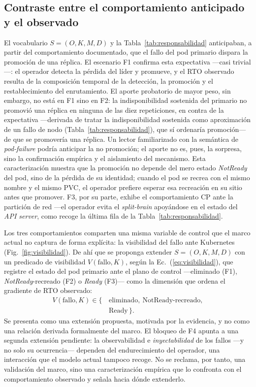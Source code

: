 \documentclass[12pt,twocolumn,letterpaper]{article}
\newcommand{\Ec}[1]{Ec.~(\ref{#1})}
\begin{document}
\subsection{Contraste entre el comportamiento anticipado y el observado}
El vocabulario $S=(O,K,M,D)$ y la Tabla~\ref{tab:responsabilidad} anticipaban, a partir del comportamiento documentado, que el fallo del pod primario dispara la promoción de una réplica. El escenario F1 confirma esta expectativa —casi trivial—: el operador detecta la pérdida del líder y promueve, y el RTO observado resulta de la composición temporal de la detección, la promoción y el restablecimiento del enrutamiento. El aporte probatorio de mayor peso, sin embargo, no está en F1 sino en F2: la indisponibilidad sostenida del primario no promovió una réplica en ninguna de las diez repeticiones, en contra de la expectativa —derivada de tratar la indisponibilidad sostenida como aproximación de un fallo de nodo (Tabla~\ref{tab:responsabilidad}), que sí ordenaría promoción— de que se promovería una réplica. Un lector familiarizado con la semántica de \textit{pod-failure} podría anticipar la no promoción; el aporte no es, pues, la sorpresa, sino la confirmación empírica y el aislamiento del mecanismo. Esta caracterización muestra que la promoción no depende del mero estado \textit{NotReady} del pod, sino de la pérdida de su identidad; cuando el pod se recrea con el mismo nombre y el mismo PVC, el operador prefiere esperar esa recreación en su sitio antes que promover. F3, por su parte, exhibe el comportamiento CP ante la partición de red —el operador evita el \textit{split-brain} apoyándose en el estado del \textit{API server}, como recoge la última fila de la Tabla~\ref{tab:responsabilidad}.

Los tres comportamientos comparten una misma variable de control que el marco actual no captura de forma explícita: la visibilidad del fallo ante Kubernetes (Fig.~\ref{fig:visibilidad}). De ahí que se proponga extender $S=(O,K,M,D)$ con un predicado de visibilidad $V(\text{fallo},K)$, según la \Ec{eq:visibilidad}, que registre el estado del pod primario ante el plano de control —eliminado (F1), \textit{NotReady}-recreado (F2) o \textit{Ready} (F3)— como la dimensión que ordena el gradiente de RTO observado:
\begin{equation}\label{eq:visibilidad}
\begin{aligned}
V(\text{fallo},K) \in \{\,&\text{eliminado},\ \text{NotReady-recreado},\\
&\text{Ready}\,\}.
\end{aligned}
\end{equation}
Se presenta como una extensión propuesta, motivada por la evidencia, y no como una relación derivada formalmente del marco. El bloqueo de F4 apunta a una segunda extensión pendiente: la observabilidad e \textit{inyectabilidad} de los fallos —y no solo su ocurrencia— dependen del endurecimiento del operador, una interacción que el modelo actual tampoco recoge. No se reclama, por tanto, una validación del marco, sino una caracterización empírica que lo confronta con el comportamiento observado y señala hacia dónde extenderlo.
\end{document}
